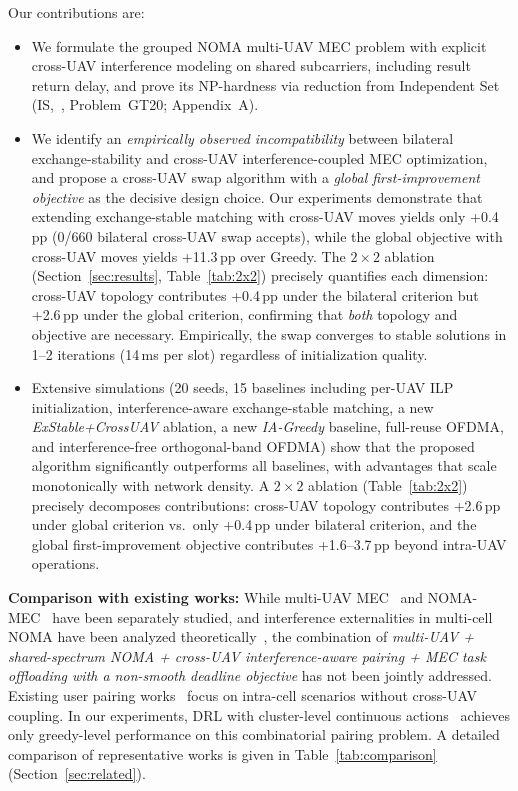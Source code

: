 \documentclass[journal]{IEEEtran}
\begin{document}
Our contributions are:
\begin{itemize}
    \item[\textbf{C1}:] We formulate the grouped NOMA multi-UAV MEC problem with explicit cross-UAV interference modeling on shared subcarriers, including result return delay, and prove its NP-hardness via reduction from Independent Set (IS,~\cite{garey1979computers}, Problem~GT20; Appendix~A).
    \item[\textbf{C2}:] We identify an \emph{empirically observed incompatibility} between bilateral exchange-stability and cross-UAV interference-coupled MEC optimization, and propose a cross-UAV swap algorithm with a \emph{global first-improvement objective} as the decisive design choice.
    Our experiments demonstrate that extending exchange-stable matching with cross-UAV moves yields only +0.4\,pp (0/660 bilateral cross-UAV swap accepts), while the global objective with cross-UAV moves yields +11.3\,pp over Greedy.
    The $2\!\times\!2$ ablation (Section~\ref{sec:results}, Table~\ref{tab:2x2}) precisely quantifies each dimension: cross-UAV topology contributes +0.4\,pp under the bilateral criterion but +2.6\,pp under the global criterion, confirming that \emph{both} topology and objective are necessary.
    Empirically, the swap converges to stable solutions in 1--2 iterations (14\,ms per slot) regardless of initialization quality.
    \item[\textbf{C3}:] Extensive simulations (20 seeds, 15 baselines including per-UAV ILP initialization, interference-aware exchange-stable matching, a new \emph{ExStable+CrossUAV} ablation, a new \emph{IA-Greedy} baseline, full-reuse OFDMA, and interference-free orthogonal-band OFDMA) show that the proposed algorithm significantly outperforms all baselines, with advantages that scale monotonically with network density. A $2\!\times\!2$ ablation (Table~\ref{tab:2x2}) precisely decomposes contributions: cross-UAV topology contributes +2.6\,pp under global criterion vs.\ only +0.4\,pp under bilateral criterion, and the global first-improvement objective contributes +1.6--3.7\,pp beyond intra-UAV operations.
\end{itemize}

\textbf{Comparison with existing works:}
While multi-UAV MEC~\cite{ma2024dynamic,zhang2023cooperative} and NOMA-MEC~\cite{ding2019impact,liu2025multiuav} have been separately studied, and interference externalities in multi-cell NOMA have been analyzed theoretically~\cite{shin2017non}, the combination of \emph{multi-UAV + shared-spectrum NOMA + cross-UAV interference-aware pairing + MEC task offloading with a non-smooth deadline objective} has not been jointly addressed.
Existing user pairing works~\cite{ali2016dynamic,nguyen2024qos} focus on intra-cell scenarios without cross-UAV coupling.
In our experiments, DRL with cluster-level continuous actions~\cite{zhou2024multiuav,sun2024drl} achieves only greedy-level performance on this combinatorial pairing problem.
A detailed comparison of representative works is given in Table~\ref{tab:comparison} (Section~\ref{sec:related}).
\end{document}
